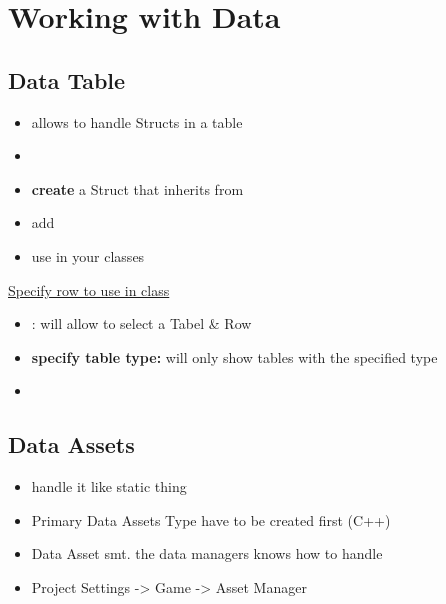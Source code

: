 \chapter{Working with Data}
    \section{Data Table}
        \begin{itemize}
            \item allows to handle Structs in a table
            \item 
            \item \textbf{create} a Struct that inherits from 
            \item add 
            \item use in your classes
        \end{itemize}

        \uline{Specify row to use in class}
            \begin{itemize}
                \item {} : will allow to select a Tabel \& Row
                \item \textbf{specify table type:}  will only show tables with the specified type
            \end{itemize}

    \begin{itemize}
        \item 
    \end{itemize}


    \section{Data Assets}
        \begin{itemize}
            \item handle it like static thing
            \item Primary Data Assets Type have to be created first (C++)
            \item Data Asset smt. the data managers knows how to handle
            \item Project Settings -> Game -> Asset Manager
        \end{itemize}